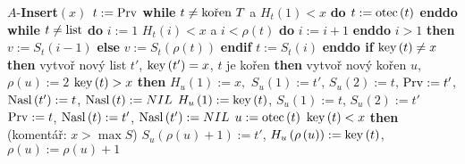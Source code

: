 $A$-{\bf Insert$\left(x\right)$\newline 
$t:=\operatorname{Prv}$\newline
while} $t\ne\text{\rm ko\v ren }T$ a $H_t\left(1\right)<x$ {\bf do $t:=\operatorname{otec}\left(t\right)$ enddo\newline 
while} $t\ne\text{\rm list}$ {\bf do}\newline 
\phantom{---}$i:=1$\newline 
\phantom{---}{\bf while} $H_t\left(i\right)<x$ a $i<\rho \left(t\right)$ {\bf do} $i:=i+1$ {\bf enddo}\newline 
\phantom{---}{\bf if} $i>1$ {\bf then} $v:=S_t\left(i-1\right)$ {\bf else} $v:=S_t\left(\rho \left(t\right)\right)$ {\bf endif}\newline 
\phantom{---}$t:=S_t\left(i\right)$\newline 
{\bf enddo\newline 
if} $\operatorname{key}\left(t\right)\ne x$ {\bf then\newline }
\phantom{---}vytvo\v r nov\'y list $t'$, $\operatorname{key}\left(t'\right)=x$,\newline
\phantom{---}{\bf if} $t$ je ko\v ren {\bf then}\newline 
\phantom{------}vytvo\v r nov\'y ko\v ren $u$, $\rho \left(u\right):=2$\newline 
\phantom{------}{\bf if} $\operatorname{key}\left(t\right)>x$ {\bf then}\newline 
\phantom{---------}$H_u\left(1\right):=x,$ $S_u\left(1\right):=t'$, $S_u\left(2\right):=t$,\newline
\phantom{---------}$\operatorname{Prv}:=t'$, $\operatorname{Nasl}\left(t'\right):=t$, $\operatorname{Nasl}\left(t\right):=NIL$\newline 
\phantom{------}{\bf else}\newline 
\phantom{---------}$H_u\left(1\right):=\operatorname{key}\left(t\right)$, $S_u\left(1\right):=t$, $S_u\left(2\right):=t'$\newline
\phantom{---------}$\operatorname{Prv}:=t$, $\operatorname{Nasl}\left(t\right):=t'$, $\operatorname{Nasl}\left(t'\right):=NIL$\newline 
\phantom{------}{\bf endif}\newline 
\phantom{---}{\bf else}\newline 
\phantom{------}$u:=\operatorname{otec}\left(t\right)$\newline 
\phantom{------}{\bf if} $\operatorname{key}\left(t\right)<x$ {\bf then}\newline  
(koment\'a\v r: $x>\max S$)\newline 
\phantom{---------}$S_u\left(\rho \left(u\right)+1\right):=t'$, $H_u\left(\rho\left(u\right)\right):=\operatorname{key}\left(t\right)$, $\rho\left(u\right):=\rho\left(u\right)+1$\newline 
